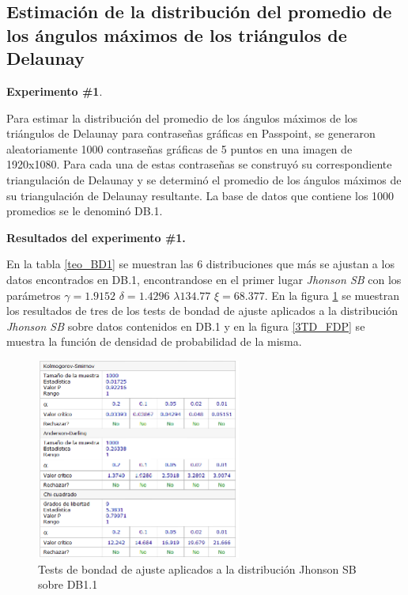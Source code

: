 \documentclass[12pt]{report}
\begin{document}
\subsection{Estimación de la distribución del promedio de los ángulos máximos de los triángulos de Delaunay }
	\textbf{Experimento \#1}.
	
	 Para estimar la distribución del promedio de los ángulos máximos de los triángulos de Delaunay para contraseñas gráficas en Passpoint, se generaron aleatoriamente 1000 contraseñas gráficas de 5 puntos en una imagen de 1920x1080. Para cada una de estas contraseñas se  construyó  su correspondiente triangulación  de Delaunay  y se  determinó el promedio  de los ángulos máximos de su triangulación de Delaunay resultante. La base de datos que contiene los 1000 promedios se le denominó DB.1.
	 
	 \textbf{Resultados del experimento \#1.}
	 
	 En la tabla \ref{teo_BD1}  se muestran las 6 distribuciones que más se ajustan a los datos encontrados en DB.1, encontrandose en el primer lugar \textit{Jhonson SB} con los parámetros $\gamma=1.9152$ $\delta=1.4296$ $\lambda134.77$  $\xi=68.377$. En la figura \ref{3TD_BONDAD} se  muestran los resultados de tres de los tests de bondad de ajuste aplicados a la distribución \textit{Jhonson SB} sobre  datos contenidos en DB.1  y en la figura \ref{3TD_FDP}  se muestra la función de densidad de probabilidad de la misma.
	  	\begin{figure}[ht]
	  	\centering
	  	
 	  	\includegraphics[width=0.6\textwidth]{3td_BONDAD.png}
	  	\caption{Tests de bondad de ajuste aplicados a la distribución Jhonson SB sobre DB1.1}
	  	\label{3TD_BONDAD}
	  \end{figure}
	  
\end{document}
